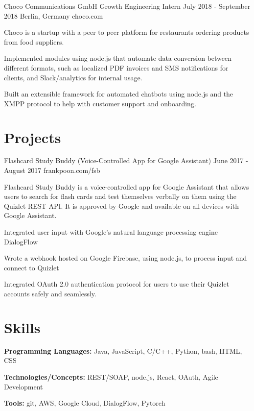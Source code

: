 \documentclass{resume}
\begin{document}
\job
{Choco Communications GmbH}
{Growth Engineering Intern}
{July 2018 - September 2018}
{Berlin, Germany}
{choco.com}
{
  Choco is a startup with a peer to peer platform for restaurants ordering 
  products from food suppliers.
  \begin{overview}
    \item Implemented modules using node.js that automate data conversion between 
          different formats, such as localized PDF invoices and SMS 
          notifications for clients, and Slack/analytics for internal usage.
    \item Built an extensible framework for automated chatbots using node.js 
          and the XMPP protocol to help with customer support and onboarding.
  \end{overview}
}

\section{Projects}

\project
{Flashcard Study Buddy (Voice-Controlled App for Google Assistant)}
{June 2017 - August 2017}
{frankpoon.com/fsb}
{
  Flashcard Study Buddy is a voice-controlled app for Google Assistant that 
  allows users to search for flash cards and test themselves verbally on them 
  using the Quizlet REST API. It is approved by Google and available on all 
  devices with Google Assistant.
  \begin{overview}
    \item Integrated user input with Google's natural language processing engine 
          DialogFlow
    \item Wrote a webhook hosted on Google Firebase, using node.js, to process 
          input and connect to Quizlet
    \item Integrated OAuth 2.0 authentication protocol for users to use their 
          Quizlet accounts safely and seamlessly.
  \end{overview}
}

\section{Skills}
\textbf{Programming Languages:} Java, JavaScript, C/C++, Python, bash, HTML, CSS

\textbf{Technologies/Concepts:} REST/SOAP, node.js, React, OAuth, Agile Development

\textbf{Tools:} git, AWS, Google Cloud, DialogFlow, Pytorch
\end{document}
